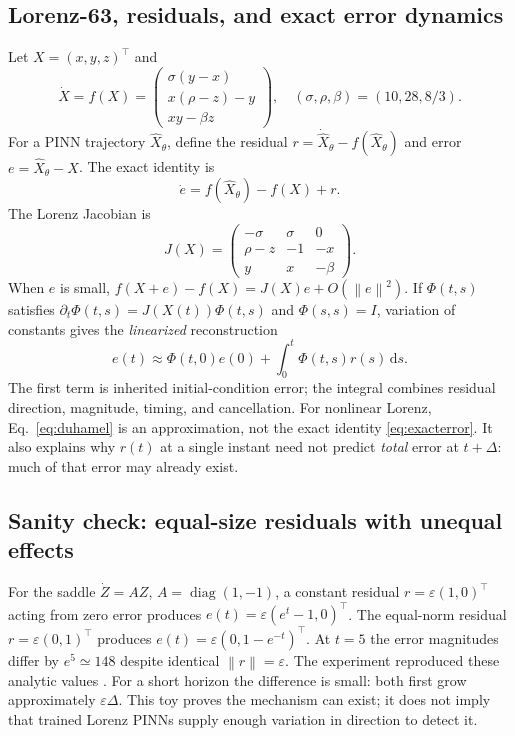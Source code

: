 \documentclass[11pt,a4paper]{article}
\newcommand{\norm}[1]{\left\lVert #1\right\rVert}
\newcommand{\dd}{\,\mathrm{d}}
\begin{document}
\subsection{Lorenz-63, residuals, and exact error dynamics}
Let $X=(x,y,z)^\top$ and
\begin{equation}\label{eq:lorenz}
\dot X=f(X)=\begin{pmatrix}\sigma(y-x)\\x(\rho-z)-y\\xy-\beta z\end{pmatrix},
\quad (\sigma,\rho,\beta)=(10,28,8/3).
\end{equation}
For a PINN trajectory $\widehat X_\theta$, define the residual $r=\dot{\widehat X}_\theta-f(\widehat X_\theta)$ and error $e=\widehat X_\theta-X$. The exact identity is
\begin{equation}\label{eq:exacterror}
\dot e=f(\widehat X_\theta)-f(X)+r.
\end{equation}
The Lorenz Jacobian is
\begin{equation}\label{eq:jac}
J(X)=\begin{pmatrix}-\sigma&\sigma&0\\\rho-z&-1&-x\\y&x&-\beta\end{pmatrix}.
\end{equation}
When $e$ is small, $f(X+e)-f(X)=J(X)e+O(\norm e^2)$. If $\Phi(t,s)$ satisfies $\partial_t\Phi(t,s)=J(X(t))\Phi(t,s)$ and $\Phi(s,s)=I$, variation of constants gives the \emph{linearized} reconstruction
\begin{equation}\label{eq:duhamel}
e(t)\approx\Phi(t,0)e(0)+\int_0^t\Phi(t,s)r(s)\dd s.
\end{equation}
The first term is inherited initial-condition error; the integral combines residual direction, magnitude, timing, and cancellation. For nonlinear Lorenz, Eq.~\eqref{eq:duhamel} is an approximation, not the exact identity \eqref{eq:exacterror}. It also explains why $r(t)$ at a single instant need not predict \emph{total} error at $t+\Delta$: much of that error may already exist.

\subsection{Sanity check: equal-size residuals with unequal effects}
For the saddle $\dot Z=AZ$, $A=\operatorname{diag}(1,-1)$, a constant residual $r=\varepsilon(1,0)^\top$ acting from zero error produces $e(t)=\varepsilon(e^t-1,0)^\top$. The equal-norm residual $r=\varepsilon(0,1)^\top$ produces $e(t)=\varepsilon(0,1-e^{-t})^\top$. At $t=5$ the error magnitudes differ by $e^5\simeq148$ despite identical $\norm r=\varepsilon$. The experiment reproduced these analytic values \cite{phase0}. For a short horizon the difference is small: both first grow approximately $\varepsilon\Delta$. This toy proves the mechanism can exist; it does not imply that trained Lorenz PINNs supply enough variation in direction to detect it.
\end{document}
